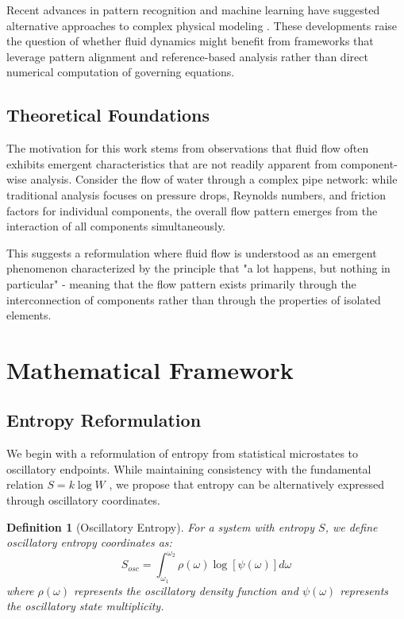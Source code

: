 \documentclass[12pt,a4paper]{article}
\newtheorem{definition}{Definition}
\begin{document}
Recent advances in pattern recognition and machine learning have suggested alternative approaches to complex physical modeling \cite{brunton2020machine}. These developments raise the question of whether fluid dynamics might benefit from frameworks that leverage pattern alignment and reference-based analysis rather than direct numerical computation of governing equations.

\subsection{Theoretical Foundations}

The motivation for this work stems from observations that fluid flow often exhibits emergent characteristics that are not readily apparent from component-wise analysis. Consider the flow of water through a complex pipe network: while traditional analysis focuses on pressure drops, Reynolds numbers, and friction factors for individual components, the overall flow pattern emerges from the interaction of all components simultaneously.

This suggests a reformulation where fluid flow is understood as an emergent phenomenon characterized by the principle that "a lot happens, but nothing in particular" - meaning that the flow pattern exists primarily through the interconnection of components rather than through the properties of isolated elements.

\section{Mathematical Framework}

\subsection{Entropy Reformulation}

We begin with a reformulation of entropy from statistical microstates to oscillatory endpoints. While maintaining consistency with the fundamental relation $S = k \log W$ \cite{boltzmann1877}, we propose that entropy can be alternatively expressed through oscillatory coordinates.

\begin{definition}[Oscillatory Entropy]
For a system with entropy $S$, we define oscillatory entropy coordinates as:
\begin{equation}
S_{osc} = \int_{\omega_1}^{\omega_2} \rho(\omega) \log[\psi(\omega)] d\omega
\end{equation}
where $\rho(\omega)$ represents the oscillatory density function and $\psi(\omega)$ represents the oscillatory state multiplicity.
\end{definition}
\end{document}
